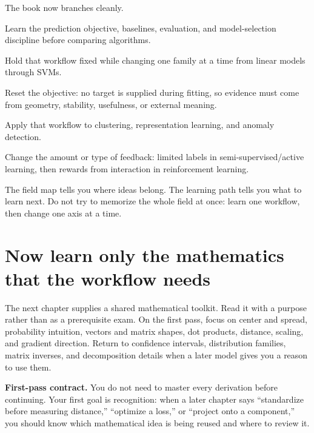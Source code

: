 The book now branches cleanly.

\begin{description}[leftmargin=1.55in,style=nextline]
  \item[Stage 3A: supervised workflow] Learn the prediction objective, baselines, evaluation, and model-selection discipline before comparing algorithms.
  \item[Stage 3B: supervised model families] Hold that workflow fixed while changing one family at a time from linear models through SVMs.
  \item[Stage 4A: unsupervised workflow] Reset the objective: no target is supplied during fitting, so evidence must come from geometry, stability, usefulness, or external meaning.
  \item[Stage 4B: unsupervised model families] Apply that workflow to clustering, representation learning, and anomaly detection.
  \item[Stage 5: other signals] Change the amount or type of feedback: limited labels in semi-supervised/active learning, then rewards from interaction in reinforcement learning.
\end{description}

\begin{keyidea}
The field map tells you where ideas belong. The learning path tells you what to learn next. Do not try to memorize the whole field at once: learn one workflow, then change one axis at a time.
\end{keyidea}

\section{Now learn only the mathematics that the workflow needs}

The next chapter supplies a shared mathematical toolkit. Read it with a purpose rather than as a prerequisite exam. On the first pass, focus on center and spread, probability intuition, vectors and matrix shapes, dot products, distance, scaling, and gradient direction. Return to confidence intervals, distribution families, matrix inverses, and decomposition details when a later model gives you a reason to use them.

\begin{firstread}
\textbf{First-pass contract.} You do not need to master every derivation before continuing. Your first goal is recognition: when a later chapter says ``standardize before measuring distance,'' ``optimize a loss,'' or ``project onto a component,'' you should know which mathematical idea is being reused and where to review it.
\end{firstread}


